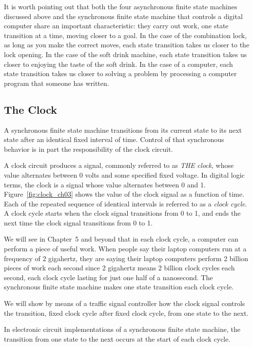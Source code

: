 \documentclass{patt}
\begin{document}
It is worth pointing out that both the four asynchronous finite state machines
discussed above and the synchronous finite state machine that controls a
digital computer share an important characteristic: they carry out work,
one state transition at a time, moving closer to a goal.  In the case of 
the combination lock, as long as you make the correct moves, each state 
transition takes us closer to the lock 
opening.  In the case of the soft drink machine, each state transition takes
us closer to enjoying the taste of the soft drink.  In the case of a computer, 
each state transition takes us closer to solving a problem by processing a 
computer program that someone has written.

\subsection{The Clock}

A synchronous finite state machine transitions from its current state to
its next state after an identical fixed interval of time.  Control of that 
synchronous behavior is in part the responsibility of the clock circuit. 

A clock circuit produces a signal, commonly referred to as {\em THE clock}, 
whose value alternates between 0 volts and some specified fixed voltage.  
In digital logic terms, the clock is a signal whose value alternates between 
0 and 1.  Figure~\ref{fig:clock_ch03} shows the value of the clock signal 
as a function of time.  Each of the repeated sequence of identical intervals 
is referred to as a {\em clock cycle}.  A clock cycle starts when the clock 
signal transitions from 0 to 1, and ends the next time the clock signal 
transitions from 0 to 1.  

We will see in Chapter~5 and beyond that in each clock cycle, a computer can
perform a piece of useful work.  When people say their laptop computers run 
at a frequency of 2 gigahertz, they are saying their laptop computers perform
2 billion pieces of work each second since 2 gigahertz means 2 billion
clock cycles each second, each clock cycle lasting for just one half of a 
nanosecond.  The synchronous finite state machine makes one state transition
each clock cycle.

We will show by means of a traffic signal controller how the clock signal 
controls the transition, fixed clock cycle after fixed clock cycle, from one 
state to the next. 

In electronic circuit implementations of a synchronous finite state machine, 
the transition from one state to the next occurs at the start of
each clock cycle.
\end{document}
